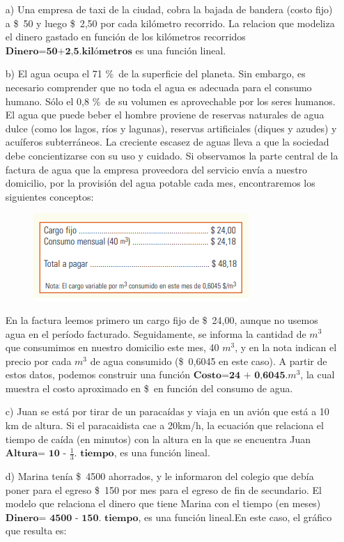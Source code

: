 \documentclass[a4paper,10pt,BCOR10mm,oneside,headsepline]{scrbook}
\begin{document}
\begin{enumerate}
	
	\item [a)] Una empresa de taxi de la ciudad, cobra la bajada de bandera (costo fijo) a \$\ 50 y luego \$\ 2,50 por cada kilómetro recorrido. La relacion que modeliza el dinero gastado en función de los kilómetros recorridos $\textbf{Dinero=50+2,5.kilómetros}$ es una función lineal.
	
	\item [b)] El agua ocupa el 71 \%\ de la superficie del planeta. Sin embargo, es necesario comprender que no toda el agua es adecuada para el consumo humano. Sólo el 0,8 \%\ de su volumen es aprovechable por los seres humanos. El agua que puede beber
	el hombre proviene de reservas naturales de agua dulce (como los lagos, ríos y lagunas), reservas artificiales (diques y azudes) y acuíferos subterráneos. La creciente escasez de aguas lleva a que la sociedad debe concientizarse con su uso y cuidado.
	Si observamos la parte central de la factura de agua que la empresa proveedora del servicio envía a nuestro domicilio, por la provisión del agua potable cada mes, encontraremos los siguientes conceptos:
	\begin{figure}[h!]
		\centering				                     	\includegraphics[width=0.70\linewidth]{facturaagua.png}
	\end{figure}
	En la factura leemos primero un cargo fijo de \$\ 24,00, aunque no usemos agua en el período facturado. Seguidamente, se informa la cantidad de $m^{3}$ que consumimos en nuestro domicilio este mes, 40 $m^{3}$, y en la nota indican el precio por cada $m^{3}$ de agua consumido (\$\ 0,6045 en este caso).
	A partir de estos datos, podemos construir una función $\textbf{Costo=24 + 0,6045.$m^{3}$}$, la cual muestra el costo aproximado en \$\ en función del consumo de agua. 
	
	\item [c)] Juan se está por tirar de un paracaídas y viaja en un avión que está a 10 km de altura. Si el paracaidista cae a 20km/h,  la ecuación que relaciona el tiempo de caída (en  minutos) con la altura en la que se encuentra Juan $\textbf{Altura= 10 - $\frac{1}{3}$. tiempo}$, es una función lineal.
	
	\item [d)] Marina tenía \$\ 4500 ahorrados, y le informaron del colegio que debía poner para el egreso \$\ 150 por mes para el egreso de fin de secundario. El modelo que relaciona el dinero que tiene Marina con el tiempo (en meses) $\textbf{Dinero= 4500 - 150. tiempo}$, es una función lineal.En este caso, el gráfico que resulta es:
\end{enumerate}
\end{document}
